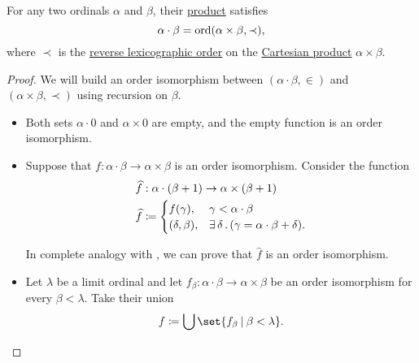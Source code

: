 \begin{proposition}\label{thm:ordinal_multiplication_cartesian_product}
  For any two ordinals \( \alpha \) and \( \beta \), their \hyperref[def:ordinal_arithmetic/multiplication]{product} satisfies
  \begin{equation*}
    \alpha \cdot \beta = \operatorname{ord}(\alpha \times \beta, \prec),
  \end{equation*}
  where \( \prec \) is the \hyperref[def:lexicographic_order]{reverse lexicographic order} on the \hyperref[def:cartesian_product]{Cartesian product} \( \alpha \times \beta \).
\end{proposition}
\begin{proof}
  We will build an order isomorphism between \( (\alpha \cdot \beta, \in) \) and \( (\alpha \times \beta, \prec) \) using recursion on \( \beta \).
  \begin{itemize}
    \item Both sets \( \alpha \cdot 0 \) and \( \alpha \times 0 \) are empty, and the empty function is an order isomorphism.
    \item Suppose that \( f: \alpha \cdot \beta \to \alpha \times \beta \) is an order isomorphism. Consider the function
    \begin{equation*}
      \begin{aligned}
        &\widehat f: \alpha \cdot (\beta + 1) \to \alpha \times (\beta + 1) \\
        &\widehat f \coloneqq \begin{cases}
          f(\gamma),       &\gamma < \alpha \cdot \beta \\
          (\delta, \beta), &\exists \thinspace \delta \thinspace . \thinspace (\gamma = \alpha \cdot \beta + \delta).
        \end{cases}
      \end{aligned}
    \end{equation*}

    In complete analogy with , we can prove that \( \widehat f \) is an order isomorphism.

    \item Let \( \lambda \) be a limit ordinal and let \( f_\beta: \alpha \cdot \beta \to \alpha \times \beta \) be an order isomorphism for every \( \beta < \lambda \). Take their union
    \begin{equation*}
      f \coloneqq \bigcup\set{ f_\beta \given \beta < \lambda }.
    \end{equation*}


\end{itemize}
\end{proof}
